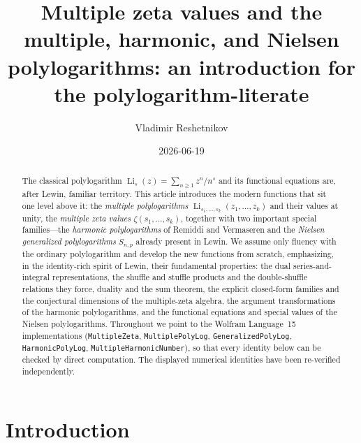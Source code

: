 \documentclass[11pt]{article}
\title{Multiple zeta values and the multiple, harmonic, and Nielsen\\
polylogarithms: an introduction for the polylogarithm-literate}
\author{Vladimir Reshetnikov}
\date{2026-06-19}
\DeclareMathOperator{\Li}{Li}
\theoremstyle{plain}
\theoremstyle{remark}
\begin{document}
\maketitle

\begin{abstract}
The classical polylogarithm $\Li_s(z)=\sum_{n\ge1}z^n/n^s$ and its functional equations are, after Lewin,
familiar territory. This article introduces the modern functions that sit one level above it: the
\emph{multiple polylogarithms} $\Li_{s_1,\dots,s_k}(z_1,\dots,z_k)$ and their values at unity, the
\emph{multiple zeta values} $\zeta(s_1,\dots,s_k)$, together with two important special families---the
\emph{harmonic polylogarithms} of Remiddi and Vermaseren and the \emph{Nielsen generalized polylogarithms}
$S_{n,p}$ already present in Lewin. We assume only fluency with the ordinary polylogarithm and develop the
new functions from scratch, emphasizing, in the identity-rich spirit of Lewin, their fundamental
properties: the dual series-and-integral representations, the shuffle and stuffle products and the
double-shuffle relations they force, duality and the sum theorem, the explicit closed-form families and the
conjectural dimensions of the multiple-zeta algebra, the argument transformations of the harmonic
polylogarithms, and the functional equations and special values of the Nielsen polylogarithms. Throughout
we point to the Wolfram Language~15 implementations (\texttt{MultipleZeta}, \texttt{MultiplePolyLog},
\texttt{GeneralizedPolyLog}, \texttt{HarmonicPolyLog}, \texttt{MultipleHarmonicNumber}), so that every
identity below can be checked by direct computation. The displayed numerical identities have been
re-verified independently.
\end{abstract}

\section{Introduction}
\end{document}
